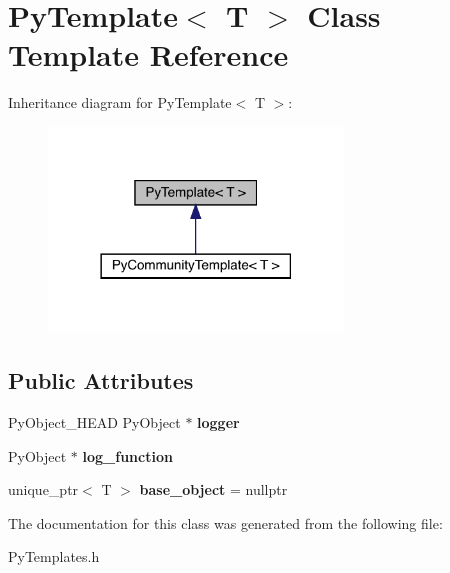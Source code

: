 \hypertarget{class_py_template}{}\section{Py\+Template$<$ T $>$ Class Template Reference}
\label{class_py_template}


Inheritance diagram for Py\+Template$<$ T $>$\+:
\nopagebreak
\begin{figure}[H]
\begin{center}
\leavevmode
\includegraphics[width=222pt]{class_py_template__inherit__graph}
\end{center}
\end{figure}
\subsection*{Public Attributes}
\begin{DoxyCompactItemize}
\item 
Py\+Object\+\_\+\+H\+E\+AD Py\+Object $\ast$ {\bfseries logger}\hypertarget{class_py_template_a5b741a472639d65f9bcad29afa16ec99}{}\label{class_py_template_a5b741a472639d65f9bcad29afa16ec99}

\item 
Py\+Object $\ast$ {\bfseries log\+\_\+function}\hypertarget{class_py_template_a98bb8152faa73d028342d5cf260f0372}{}\label{class_py_template_a98bb8152faa73d028342d5cf260f0372}

\item 
unique\+\_\+ptr$<$ T $>$ {\bfseries base\+\_\+object} = nullptr\hypertarget{class_py_template_a14da655e6d3c0b398d8478058316d326}{}\label{class_py_template_a14da655e6d3c0b398d8478058316d326}

\end{DoxyCompactItemize}


The documentation for this class was generated from the following file\+:\begin{DoxyCompactItemize}
\item 
Py\+Templates.\+h\end{DoxyCompactItemize}
